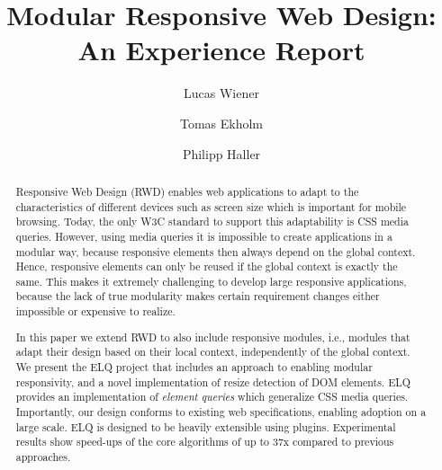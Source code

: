 \documentclass[sigplan,9pt]{acmart}
\newcommand{\elq}{ELQ}
\begin{document}
\title{Modular Responsive Web Design: An Experience Report}

\author{Lucas Wiener}

\author{Tomas Ekholm}

\author{Philipp Haller}

\renewcommand{\shortauthors}{L. Wiener, T. Ekholm, and P. Haller}
\renewcommand{\shorttitle}{Modular Responsive Web Design}

\begin{abstract}
    Responsive Web Design (RWD) enables web applications to adapt to the characteristics of different devices such as screen size which is important for mobile browsing.
    Today, the only W3C standard to support this adaptability is CSS media queries.
    However, using media queries it is impossible to create applications in a modular way, because responsive elements then always depend on the global context.
    Hence, responsive elements can only be reused if the global context is exactly the same.
    This makes it extremely challenging to develop large responsive applications, because the lack of true modularity makes certain requirement changes either impossible or expensive to realize.

    In this paper we extend RWD to also include responsive modules, i.e., modules that adapt their design based on their local context, independently of the global context.
    We present the \elq{} project that includes an approach to enabling modular responsivity, and a novel implementation of resize detection of DOM elements.
    \elq{} provides an implementation of \emph{element queries} which generalize CSS media queries.
    Importantly, our design conforms to existing web specifications, enabling adoption on a large scale.
    \elq{} is designed to be heavily extensible using plugins.
    Experimental results show speed-ups of the core algorithms of up to 37x compared to previous approaches.
\end{abstract}

%
%
\end{document}
